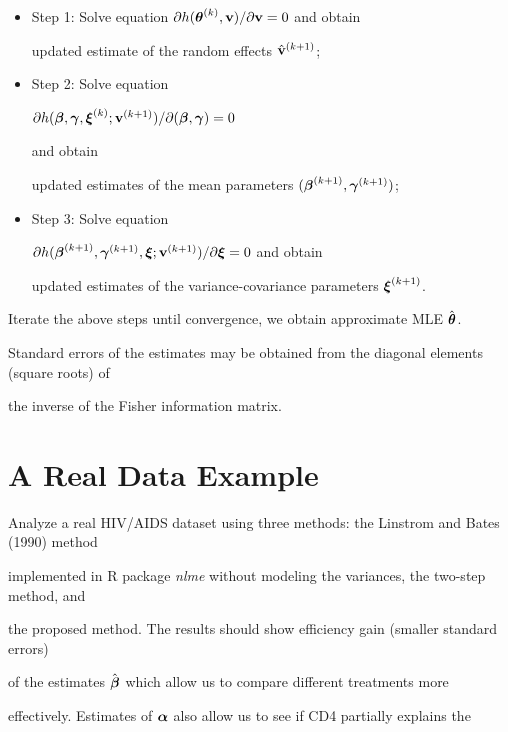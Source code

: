 \documentclass[12pt]{article}
\newcommand{\btheta}{\mbox{\boldmath $\theta$}}
\newcommand{\balpha}{\mbox{\boldmath $\alpha$}}
\newcommand{\bgamma}{\mbox{\boldmath $\gamma$}}
\newcommand{\bbeta}{\mbox{\boldmath $\beta$}}
\newcommand{\bxi}{\mbox{\boldmath $\xi$}}
\begin{document}
\begin{itemize}

\item Step 1: Solve equation $\partial h({\btheta}^{(k)}, {\bf v})/\partial{\bf v}=0$ and obtain 

updated estimate of the random effects $\hat{\bf v}^{(k+1)}$; 

\item Step 2: Solve equation 

$\partial h(\bbeta, {\bgamma}, {\bxi}^{(k)}; {\bf v}^{(k+1)})/\partial({\bbeta},{\bgamma})=0$ 

and obtain  

updated estimates of the mean parameters $(\bbeta^{(k+1)},{\bgamma}^{(k+1)})$; 

\item  Step 3: Solve equation

$\partial h(\bbeta^{(k+1)}, {\bgamma}^{(k+1)}, {\bxi}; {\bf v}^{(k+1)})/\partial{\bxi}=0$ and obtain

updated estimates of the variance-covariance parameters $\bxi^{(k+1)}$.

\end{itemize}

Iterate the above steps until convergence, we obtain approximate MLE $\hat{\btheta}$. 

Standard errors of the estimates may be obtained from the diagonal elements (square roots) of 

the inverse of the Fisher information matrix. 





\section{A Real Data Example}



    Analyze a real HIV/AIDS dataset using three methods: the Linstrom and Bates (1990) method 

implemented in R package {\em nlme} without modeling the variances, the two-step method, and 

the proposed method. The results should show efficiency gain (smaller standard errors) 

of the estimates $\hat{\bbeta}$ which allow us to compare different treatments more 

effectively. Estimates of $\balpha$ also allow us to see if CD4 partially explains the 
\end{document}
